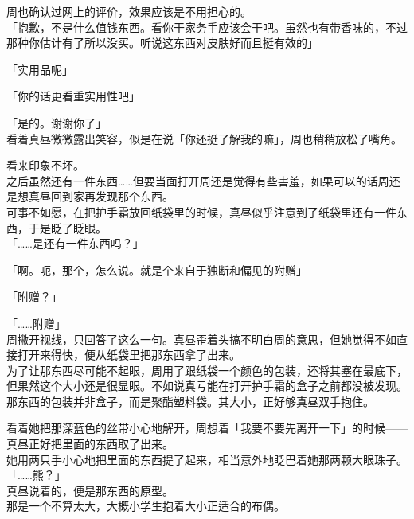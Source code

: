 周也确认过网上的评价，效果应该是不用担心的。\\

「抱歉，不是什么值钱东西。看你干家务手应该会干吧。虽然也有带香味的，不过那种你估计有了所以没买。听说这东西对皮肤好而且挺有效的」

「实用品呢」

「你的话更看重实用性吧」

「是的。谢谢你了」\\%

看着真昼微微露出笑容，似是在说「你还挺了解我的嘛」，周也稍稍放松了嘴角。

看来印象不坏。\\

之后虽然还有一件东西……但要当面打开周还是觉得有些害羞，如果可以的话周还是想真昼回到家再发现那个东西。\\

可事不如愿，在把护手霜放回纸袋里的时候，真昼似乎注意到了纸袋里还有一件东西，于是眨了眨眼。\\

「……是还有一件东西吗？」

「啊。呃，那个，怎么说。就是个来自于独断和偏见的附赠」

「附赠？」

「……附赠」\\

周撇开视线，只回答了这么一句。真昼歪着头搞不明白周的意思，但她觉得不如直接打开来得快，便从纸袋里把那东西拿了出来。\\

为了让那东西尽可能不起眼，周用了跟纸袋一个颜色的包装，还将其塞在最底下，但果然这个大小还是很显眼。不如说真亏能在打开护手霜的盒子之前都没被发现。\\

那东西的包装并非盒子，而是聚酯塑料袋。其大小，正好够真昼双手抱住。

看着她把那深蓝色的丝带小心地解开，周想着「我要不要先离开一下」的时候——真昼正好把里面的东西取了出来。\\

她用两只手小心地把里面的东西提了起来，相当意外地眨巴着她那两颗大眼珠子。\\

「……熊？」\\

真昼说着的，便是那东西的原型。\\

那是一个不算太大，大概小学生抱着大小正适合的布偶。

